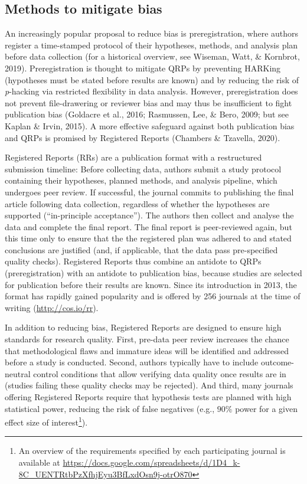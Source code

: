\documentclass[british,,jou,floatsintext]{apa6}
\begin{document}
\hypertarget{methods-to-mitigate-bias}{%
\subsection{Methods to mitigate bias}\label{methods-to-mitigate-bias}}

An increasingly popular proposal to reduce bias is preregistration, where authors register a time-stamped protocol of their hypotheses, methods, and analysis plan before data collection (for a historical overview, see Wiseman, Watt, \& Kornbrot, 2019).
Preregistration is thought to mitigate QRPs by preventing HARKing (hypotheses must be stated before results are known) and by reducing the risk of \emph{p}-hacking via restricted flexibility in data analysis.
However, preregistration does not prevent file-drawering or reviewer bias and may thus be insufficient to fight publication bias (Goldacre et al., 2016; Rasmussen, Lee, \& Bero, 2009; but see Kaplan \& Irvin, 2015).
A more effective safeguard against both publication bias and QRPs is promised by Registered Reports (Chambers \& Tzavella, 2020).

Registered Reports (RRs) are a publication format with a restructured submission timeline:
Before collecting data, authors submit a study protocol containing their hypotheses, planned methods, and analysis pipeline, which undergoes peer review.
If successful, the journal commits to publishing the final article following data collection, regardless of whether the hypotheses are supported (\enquote{in-principle acceptance}).
The authors then collect and analyse the data and complete the final report.
The final report is peer-reviewed again, but this time only to ensure that the the registered plan was adhered to and stated conclusions are justified (and, if applicable, that the data pass pre-specified quality checks).
Registered Reports thus combine an antidote to QRPs (preregistration) with an antidote to publication bias, because studies are selected for publication before their results are known.
Since its introduction in 2013, the format has rapidly gained popularity and is offered by 256 journals at the time of writing (\url{http://cos.io/rr}).

In addition to reducing bias, Registered Reports are designed to ensure high standards for research quality.
First, pre-data peer review increases the chance that methodological flaws and immature ideas will be identified and addressed before a study is conducted.
Second, authors typically have to include outcome-neutral control conditions that allow verifying data quality once results are in (studies failing these quality checks may be rejected).
And third, many journals offering Registered Reports require that hypothesis tests are planned with high statistical power, reducing the risk of false negatives (e.g., \(90\%\) power for a given effect size of interest\footnote{An overview of the requirements specified by each participating journal is available at \url{https://docs.google.com/spreadsheets/d/1D4_k-8C_UENTRtbPzXfhjEyu3BfLxdOsn9j-otrO870}}).
\end{document}
